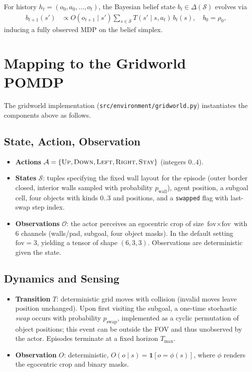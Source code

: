 \documentclass[11pt]{article}
\begin{document}
For history \(h_t=(o_0,a_0,\ldots,o_t)\), the Bayesian belief state \(b_t\in\Delta(\mathcal{S})\) evolves via
\begin{align}
  b_{t+1}(s') &\propto O(o_{t+1}\mid s')\sum_{s\in\mathcal{S}} T(s'\mid s,a_t)\, b_t(s),\quad b_0=\rho_0,
\end{align}
inducing a fully observed MDP on the belief simplex.

\section{Mapping to the Gridworld POMDP}

The gridworld implementation (\texttt{src/environment/gridworld.py}) instantiates the components above as follows.

\subsection{State, Action, Observation}
\begin{itemize}
  \item \textbf{Actions} \(\mathcal{A}=\{\textsc{Up},\textsc{Down},\textsc{Left},\textsc{Right},\textsc{Stay}\}\) (integers \(0..4\)).
  \item \textbf{States} \(\mathcal{S}\): tuples specifying the fixed wall layout for the episode (outer border closed, interior walls sampled with probability \(p_{\text{wall}}\)), agent position, a subgoal cell, four objects with kinds \(0..3\) and positions, and a \texttt{swapped} flag with last-swap step index.
  \item \textbf{Observations} \(\mathcal{O}\): the actor perceives an egocentric crop of size \(\text{fov}\times\text{fov}\) with 6 channels (walls/pad, subgoal, four object masks). In the default setting \(\text{fov}=3\), yielding a tensor of shape \((6,3,3)\). Observations are deterministic given the state.
\end{itemize}

\subsection{Dynamics and Sensing}
\begin{itemize}
  \item \textbf{Transition} \(T\): deterministic grid moves with collision (invalid moves leave position unchanged). Upon first visiting the subgoal, a one-time stochastic \emph{swap} occurs with probability \(p_{\text{swap}}\), implemented as a cyclic permutation of object positions; this event can be outside the FOV and thus unobserved by the actor. Episodes terminate at a fixed horizon \(T_{\max}\).
  \item \textbf{Observation} \(O\): deterministic, \(O(o\mid s)=\mathbf{1}[o=\phi(s)]\), where \(\phi\) renders the egocentric crop and binary masks.
\end{itemize}
\end{document}
